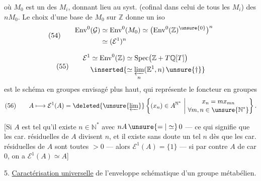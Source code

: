 
où $M_0$ est un des $M_i$, donnant lieu
au syst. (cofinal dans celui de tous les
$M_i$) des $nM_0$. Le choix d'une
base de $M_0$ sur $\mathbb{Z}$ donne un
iso
\[
(54)\qquad
\begin{aligned}
\operatorname{Env}^{0}(\mathcal{G})
&\simeq \operatorname{Env}^{0}(M_0)
\simeq \bigl(\operatorname{Env}^{0}(\mathbb{Z})^{\unsure{0}}\bigr)^n\\
&\simeq(\mathcal{E}^{1})^n
\end{aligned}
\]


\[
(55)\qquad
\begin{aligned}
\mathcal{E}^{1}
&\simeq \operatorname{Env}^{0}(\mathbb{Z})
\simeq\operatorname{Spec}\bigl(\mathbb{Z}+T\mathbb{Q}[T]\bigr)\\
&\inserted{\simeq\varprojlim_n(\mathbb{E}^{1},n)\,\unsure{\dagger}}
\end{aligned}
\]
est le schéma en groupes envisagé plus
haut, qui représente le foncteur en groupes
\[
(56)\qquad
A\longmapsto\mathcal{E}^{1}(A)
=\deleted{\unsure{\varprojlim}}
\left\{(x_n)\in A^{\mathbb{N}^{*}}\ \middle|\
\begin{gathered}
x_n=mx_{mn}\\[-2pt]
\forall m,n\in\unsure{\mathbb{N}^{*}}
\end{gathered}
\right\}.
\]

[Si $A$ est tel qu'il existe $n\in\mathbb{N}^{*}$ avec
$nA\,\unsure{=|\simeq}\,0$ ---
ce qui signifie
que les car. résiduelles de $A$ divisent $n$,
et  il existe sans doute un tel $n$
dès que les car. résiduelles de $A$ sont
toutes $>0$ --- alors $\mathcal{E}^{1}(A)=\{1\}$ ---
si par contre $A$ de car $0$, on a $\mathcal{E}^{1}(A)\simeq A$]


5. \uline{Caractérisation universelle} de l'enveloppe schématique d'un groupe métabélien.

